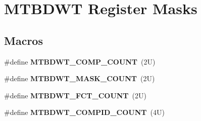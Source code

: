 \hypertarget{group___m_t_b_d_w_t___register___masks}{}\section{M\+T\+B\+D\+WT Register Masks}
\label{group___m_t_b_d_w_t___register___masks}
\subsection*{Macros}
\begin{DoxyCompactItemize}
\item 
\mbox{\label{group___m_t_b_d_w_t___register___masks_ga59123aa81fc436ba16780285ba64ccbf}} 
\#define {\bfseries M\+T\+B\+D\+W\+T\+\_\+\+C\+O\+M\+P\+\_\+\+C\+O\+U\+NT}~(2\+U)
\item 
\mbox{\label{group___m_t_b_d_w_t___register___masks_ga1a804f507c5738c6ab65a55d23649be3}} 
\#define {\bfseries M\+T\+B\+D\+W\+T\+\_\+\+M\+A\+S\+K\+\_\+\+C\+O\+U\+NT}~(2\+U)
\item 
\mbox{\label{group___m_t_b_d_w_t___register___masks_ga115c9013b3c62faa014a0809988f68ee}} 
\#define {\bfseries M\+T\+B\+D\+W\+T\+\_\+\+F\+C\+T\+\_\+\+C\+O\+U\+NT}~(2\+U)
\item 
\mbox{\label{group___m_t_b_d_w_t___register___masks_ga5297046f4c3e158a1e2231f617f052fa}} 
\#define {\bfseries M\+T\+B\+D\+W\+T\+\_\+\+C\+O\+M\+P\+I\+D\+\_\+\+C\+O\+U\+NT}~(4\+U)
\end{DoxyCompactItemize}

